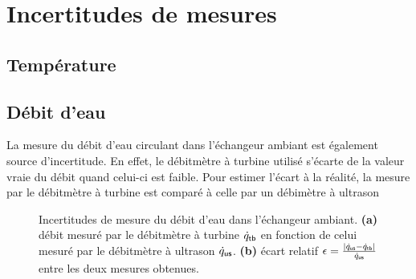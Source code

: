 \section{Incertitudes de mesures}


\subsection{Température}

\subsection{Débit d'eau}

La mesure du débit d'eau circulant dans l'échangeur ambiant est également source d'incertitude. En effet, le débitmètre à turbine utilisé  s'écarte de la valeur vraie du débit quand celui-ci est faible. Pour estimer l'écart à la réalité, la mesure par le débitmètre à turbine est comparé à celle par un débimètre à ultrason 

\begin{figure}[!ht]
    \centering
    
    \caption[Incertitudes de mesure du débit d'eau dans l'échangeur ambiant]{Incertitudes de mesure du débit d'eau dans l'échangeur ambiant. \textbf{(a)} débit mesuré par le débitmètre à turbine $\dot q_{\sf tb}$ en fonction de celui mesuré par le débitmètre à ultrason $\dot q_{\sf us}$. \textbf{(b)} écart relatif $\epsilon=\frac{|\dot q_{\sf us}-\dot q_{\sf tb}|}{\dot q_{\sf us}}$ entre les deux mesures obtenues.}
    \label{fig:IncertitudeDebitEau}
\end{figure}%

